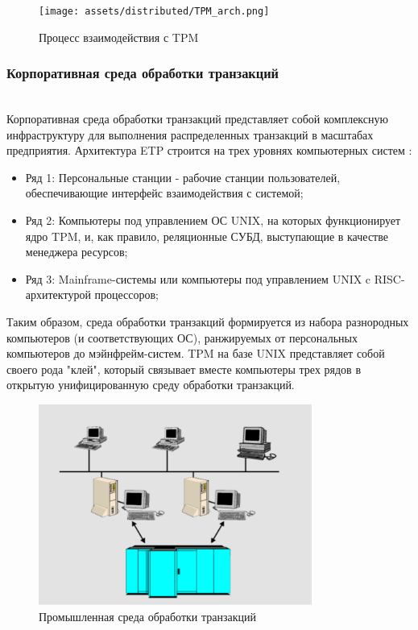 \begin{figure}[h!]
    \centering
    \texttt{[image: assets/distributed/TPM\_arch.png]}
    \caption{Процесс взаимодействия с TPM}
    \label{tpm_process}
\end{figure}

\subsubsection{Корпоративная среда обработки транзакций}~\\

Корпоративная среда обработки транзакций представляет собой комплексную инфраструктуру для выполнения распределенных транзакций в масштабах 
предприятия. Архитектура ETP строится на трех уровнях компьютерных систем \autocite{TransactionMonitors}:

\begin{itemize}
    \item Ряд 1: Персональные станции - рабочие станции пользователей, обеспечивающие интерфейс взаимодействия с системой;
    \item Ряд 2: Компьютеры под управлением ОС UNIX, на которых функционирует ядро TPM, и, как правило, реляционные СУБД, выступающие в качестве менеджера ресурсов;
    \item Ряд 3: Mainframe-системы или компьютеры под управлением UNIX c RISC-архитектурой процессоров;
\end{itemize}

Таким образом, среда обработки транзакций формируется из набора разнородных компьютеров (и соответствующих ОС),
ранжируемых от персональных компьютеров до мэйнфрейм-систем. TPM на базе UNIX представляет собой своего
рода "клей", который связывает вместе компьютеры трех рядов в открытую унифицированную среду обработки транзакций.

\begin{figure}[h!]
    \centering
    \includegraphics[width=0.8\textwidth]{assets/distributed/ETP.png}
    \caption{Промышленная среда обработки транзакций}
\end{figure}


